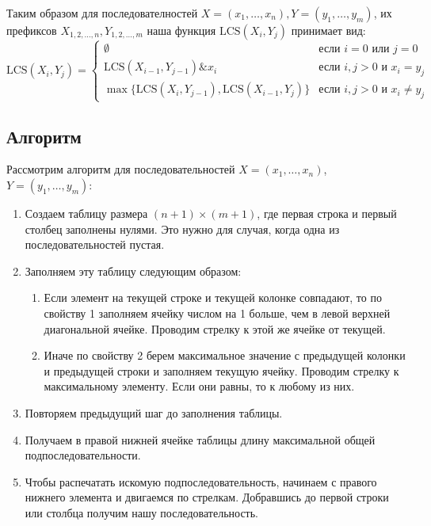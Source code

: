 \documentclass[12pt]{article}
\def\LCS{
    \mathrm{LCS}
}
\begin{document}
    Таким образом для последователностей $X = (x_1,\ldots,x_n), Y=(y_1,\ldots,y_m)$,
    их префиксов $X_{1,2,\ldots,n}, Y_{1,2,\ldots,m}$ наша функция $\LCS(X_i,Y_j)$ принимает вид:
    \begin{equation*}
        \LCS(X_i,Y_j) = \begin{cases}
                \emptyset & \text{если } i = 0 \text{ или } j = 0 \\
                \LCS(X_{i-1}, Y_{j-1})\&x_i & \text{если } i,j>0 \text{ и } x_i=y_j \\
                \max\{\LCS(X_{i}, Y_{j-1}), \LCS(X_{i-1}, Y_{j})\} & \text{если } i,j>0 \text{ и } x_i\neq y_j
            \end{cases}
    \end{equation*}

\subsection{Алгоритм}
Рассмотрим алгоритм для последовательностей $X = (x_1,\ldots,x_n)$,
$Y=(y_1,\ldots,y_m)$:
\begin{enumerate}
    \item Создаем таблицу размера $(n+1)\times (m+1)$, где
        первая строка и первый столбец заполнены нулями.
        Это нужно для случая, когда одна из последовательностей пустая.
    \item Заполняем эту таблицу следующим образом:
        \begin{enumerate}
            \item Если элемент на текущей строке и текущей колонке
                совпадают, то по свойству 1 заполняем ячейку числом на 1 больше,
                чем в левой верхней диагональной ячейке. Проводим
                стрелку к этой же ячейке от текущей.
            \item Иначе по свойству 2 берем максимальное значение с предыдущей колонки
                и предыдущей строки и заполняем текущую ячейку. Проводим стрелку
                к максимальному элементу. Если они равны, то к любому из них.
        \end{enumerate}
    \item Повторяем предыдущий шаг до заполнения таблицы.
    \item Получаем в правой нижней ячейке таблицы длину максимальной общей подпоследовательности.
    \item Чтобы распечатать искомую подпоследовательность, начинаем
        с правого нижнего элемента и двигаемся по стрелкам. Добравшись
        до первой строки или столбца получим нашу последовательность.
\end{enumerate}
\end{document}
